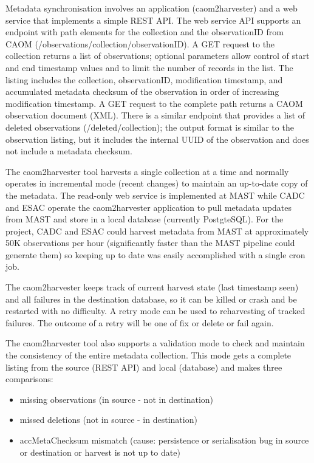 \documentclass[11pt,twoside]{article}
\begin{document}
Metadata synchronisation involves an application (caom2harvester) and a web service that implements a simple REST \citep{REST} API. The web service API supports an endpoint with path elements for the collection and the observationID from CAOM (/observations/{collection}/{observationID}). A GET request to the collection returns a list of observations; optional parameters allow control of start and end timestamp values and to limit the number of records in the list. The listing includes the collection, observationID, modification timestamp, and accumulated metadata checksum of the observation  in order of increasing modification timestamp. A GET request to the complete path returns a CAOM  observation document (XML). There is a similar endpoint that provides a list of deleted observations (/deleted/{collection}); the output format is similar to the observation listing, but it includes the internal UUID of the observation and does not include a metadata checksum.

The caom2harvester tool harvests a single collection at a time and normally operates in incremental mode (recent changes) to maintain an up-to-date copy of the metadata. The read-only web service is implemented at MAST while CADC and ESAC operate the caom2harvester application to pull metadata updates from MAST and store in a local database (currently PostgteSQL). For the project, CADC and ESAC could harvest metadata from MAST at approximately 50K observations per hour (significantly faster than the MAST pipeline could generate them) so keeping up to date was easily accomplished with a single cron job. 

The caom2harvester keeps track of current harvest state (last timestamp seen) and all failures in the destination database, so it can be killed or crash and be restarted with no difficulty. A retry mode can be used to reharvesting of tracked failures. The outcome of a retry will be one of fix or delete or fail again.

The caom2harvester tool also supports a validation mode to check and maintain the consistency of the entire metadata collection. This mode gets a complete listing from the source (REST API) and local (database) and makes three comparisons: 
\begin{itemize}
\item{missing observations (in source - not in destination)}
\item{missed deletions (not in source - in destination)}
\item{accMetaChecksum mismatch (cause: persistence or serialisation bug in source or destination or harvest is not up to date)}
\end{itemize}
\end{document}
